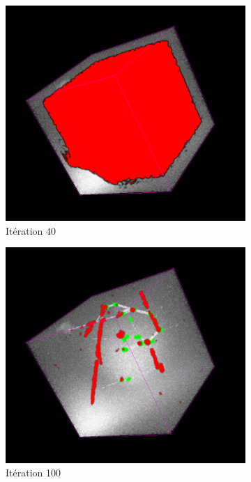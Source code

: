 \begin{figure}[!ht]
\begin{subfigure}{0.45\textwidth}
        \includegraphics[width=\textwidth]{Images/exp_seg_40.png}
        \caption{Itération $40$}
    \end{subfigure}
    \begin{subfigure}{0.45\textwidth}
        \includegraphics[width=\textwidth]{Images/exp_seg_100.png}
        \caption{Itération 100}
    \end{subfigure}
    \begin{subfigure}{0.45\textwidth}

\end{subfigure}
\end{figure}
